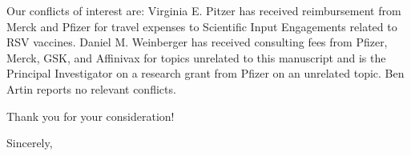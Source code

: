 \documentclass[10pt]{letter} %
\begin{document}
\begin{letter}{}
Our conflicts of interest are: Virginia E. Pitzer has received reimbursement from Merck and Pfizer for travel expenses to Scientific Input Engagements related to RSV vaccines. Daniel M. Weinberger has received consulting fees from Pfizer, Merck, GSK, and Affinivax for topics unrelated to this manuscript and is the Principal Investigator on a research grant from Pfizer on an unrelated topic. Ben Artin reports no relevant conflicts.

Thank you for your consideration!

\vspace{2\parskip} %
\closing{Sincerely,}
\vspace{2\parskip} %


\end{letter}
 
\end{document}
